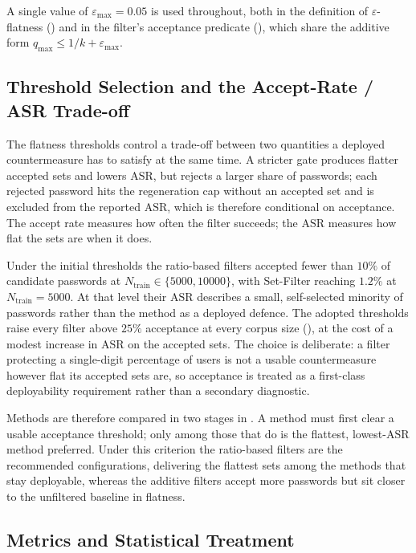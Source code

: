 A single value of $\varepsilon_{\max} = 0.05$ is used throughout, both
in the definition of $\varepsilon$-flatness () and in
the filter's acceptance predicate (), which
share the additive form $q_{\max} \le 1/k + \varepsilon_{\max}$.

\subsection{Threshold Selection and the Accept-Rate / ASR Trade-off}
\label{sec:method-threshold-tradeoff}

The flatness thresholds control a trade-off between two quantities a
deployed countermeasure has to satisfy at the same time. A stricter gate
produces flatter accepted sets and lowers $\mathrm{ASR}$, but rejects a
larger share of passwords; each rejected password hits the regeneration
cap without an accepted set and is excluded from the reported
$\mathrm{ASR}$, which is therefore conditional on acceptance. The accept
rate measures how often the filter succeeds; the $\mathrm{ASR}$ measures
how flat the sets are when it does.

Under the initial thresholds the ratio-based filters accepted fewer than
$10\%$ of candidate passwords at $N_{\text{train}} \in \{5000, 10000\}$,
with Set-Filter reaching $1.2\%$ at $N_{\text{train}} = 5000$. At that
level their $\mathrm{ASR}$ describes a small, self-selected minority of
passwords rather than the method as a deployed defence. The adopted
thresholds raise every filter above $25\%$ acceptance at every corpus
size (), at the cost of a modest increase in
$\mathrm{ASR}$ on the accepted sets. The choice is deliberate: a filter
protecting a single-digit percentage of users is not a usable
countermeasure however flat its accepted sets are, so acceptance is
treated as a first-class deployability requirement rather than a
secondary diagnostic.

Methods are therefore compared in two stages in . A
method must first clear a usable acceptance threshold; only among those
that do is the flattest, lowest-$\mathrm{ASR}$ method preferred. Under
this criterion the ratio-based filters are the recommended
configurations, delivering the flattest sets among the methods that stay
deployable, whereas the additive filters accept more passwords but sit
closer to the unfiltered baseline in flatness.

\subsection{Metrics and Statistical Treatment}

